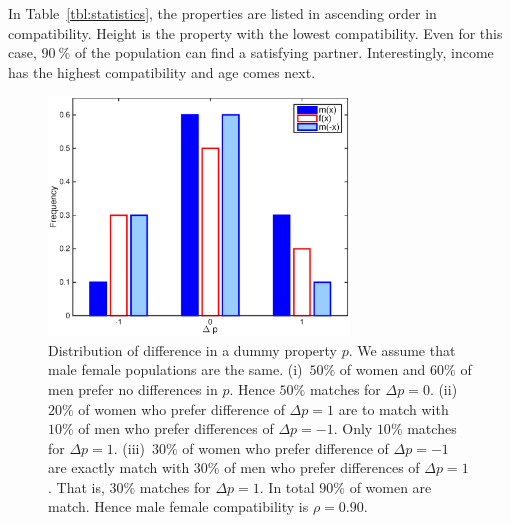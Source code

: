 \documentclass[journal,comsoc]{IEEEtran}
\newcommand{\myFigWidth}{8cm}
\newcommand{\reftbl}[1]{Table~\ref{#1}}
\begin{document}
In \reftbl{tbl:statistics}, 
the properties are listed in ascending order in compatibility.
Height is the property with the lowest compatibility.
Even for this case,
$90~\%$ of the population can find a satisfying partner.
Interestingly,
income has the highest compatibility and age comes next. 


\begin{figure}%
\centering
	\includegraphics[width=\myFigWidth]{imgDiff_Dummy}
	\caption{
		Distribution of difference in 
		a dummy property $p$.
		We assume that male female populations are the same.
		(i)~$50\%$ of women and 
		$60\%$ of men prefer no differences in $p$.
		Hence $50\%$ matches for $\Delta p = 0$.
		(ii)~$20\%$ of women who prefer difference of $\Delta p = 1$ 
		are to match with
		$10\%$ of men who prefer differences of $\Delta p = -1$.
		Only $10\%$ matches for $\Delta p = 1$.
		(iii)~$30\%$ of women who prefer difference of $\Delta p = -1$ 
		are exactly match with
		$30\%$ of men who prefer differences of $\Delta p = 1$.
		That is, $30\%$ matches for $\Delta p = 1$.
		In total $90\%$ of women are match.
		Hence male female compatibility is $\rho = 0.90$.
	}
	\label{fig:propertyDifferenceDummy}
\end{figure}
\end{document}
